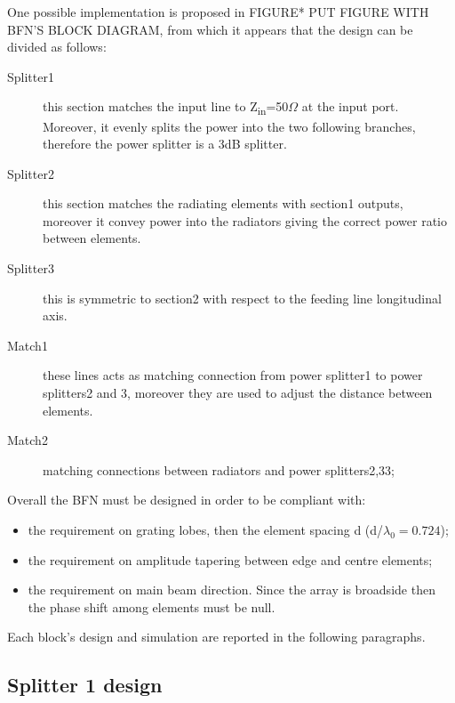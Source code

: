 One possible implementation is proposed in FIGURE* PUT FIGURE WITH BFN'S BLOCK DIAGRAM, from which it appears that the design can be divided as follows: 
\begin{description}
	\item [Splitter1] this section matches the input line to Z\textsubscript{in}=50$\Omega$ at the input port. Moreover, it evenly splits the power into the two following branches, therefore the power splitter is a 3dB splitter. 
	\item [Splitter2] this section matches the radiating elements with section1 outputs, moreover it convey power into the radiators giving the correct power ratio between elements.
	\item [Splitter3] this is symmetric to section2 with respect to the feeding line longitudinal axis. 
	\item [Match1] these lines acts as matching connection from power splitter1 to power splitters2 and 3, moreover they are used to adjust the distance between elements.
	\item [Match2] matching connections between radiators and power splitters2,33;
\end{description}
Overall the BFN must be designed in order to be compliant with:
\begin{itemize}
	\item the requirement on grating lobes, then the element spacing d (d/$\lambda_0=0.724$);
	\item the requirement on amplitude tapering between edge and centre elements;
	\item the requirement on main beam direction. Since the array is broadside then the phase shift among elements must be null.
\end{itemize}
Each block's design and simulation are reported in the following paragraphs.

\subsection{Splitter 1 design}

